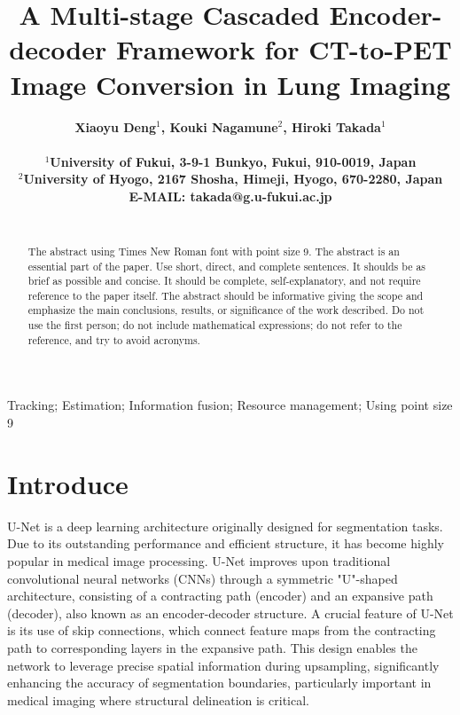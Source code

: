 \documentclass[a4paper, times, 10pt,twocolumn]{article}
\begin{document}
\title{A Multi-stage Cascaded Encoder-decoder Framework for CT-to-PET Image Conversion in Lung Imaging}  %

\author{\bf{\normalsize{Xiaoyu Deng${^1}$, Kouki Nagamune${^2}$, Hiroki Takada${^1}$}}\\ %
\\
\normalsize{$^1$University of Fukui, 3-9-1 Bunkyo, Fukui, 910-0019, Japan}\\
\normalsize{$^2$University of Hyogo, 2167 Shosha, Himeji, Hyogo, 670-2280, Japan} \\
\normalsize{E-MAIL: takada@g.u-fukui.ac.jp}\\
\\}

\maketitle \thispagestyle{empty}

\begin{abstract}
   {The abstract using Times New Roman font with point size 9. The abstract is an essential part of the paper. Use short, direct, and complete sentences. It shoulds be as brief as possible and concise. It should be complete, self-explanatory, and not require reference to the paper itself. The abstract should be informative giving the scope and emphasize the main conclusions, results, or significance of the work described. Do not use the first person; do not include mathematical expressions; do not refer to the reference, and try to avoid acronyms.}
\end{abstract}
\begin{keywords}
   {Tracking; Estimation; Information fusion; Resource
    management; Using point size 9}
\end{keywords}

\section{Introduce}
U-Net is a deep learning architecture originally designed for segmentation tasks. Due to its outstanding performance and efficient structure, it has become highly popular in medical image processing. U-Net improves upon traditional convolutional neural networks (CNNs) through a symmetric "U"-shaped architecture, consisting of a contracting path (encoder) and an expansive path (decoder), also known as an encoder-decoder structure. A crucial feature of U-Net is its use of skip connections, which connect feature maps from the contracting path to corresponding layers in the expansive path. This design enables the network to leverage precise spatial information during upsampling, significantly enhancing the accuracy of segmentation boundaries, particularly important in medical imaging where structural delineation is critical.
\end{document}
